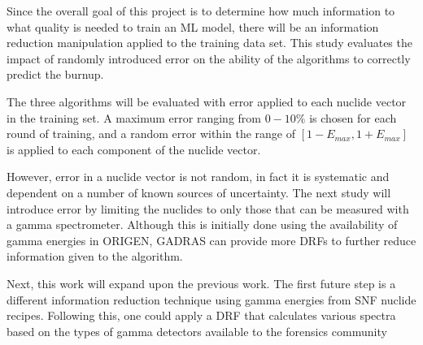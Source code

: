 Since the overall goal of this project is to determine how much information to
what quality is needed to train an \gls{ML} model, there will be an
information reduction manipulation applied to the training data set. This study
evaluates the impact of randomly introduced error on the ability of the
algorithms to correctly predict the burnup. 

The three algorithms will be evaluated with error applied to each nuclide
vector in the training set.  A maximum error ranging from $0 - 10\%$ is chosen
for each round of training, and a random error within the range of $[1-E_{max},
1+E_{max}]$ is applied to each component of the nuclide vector.

However, error in a nuclide vector is not random, in fact it is systematic and
dependent on a number of known sources of uncertainty. The next study will
introduce error by limiting the nuclides to only those that can be measured
with a gamma spectrometer. Although this is initially done using the
availability of gamma energies in \gls{ORIGEN}, \gls{GADRAS} can provide more
\gls{DRF}s to further reduce information given to the algorithm.

Next, this work will expand upon the previous work.  The first future step is a
different information reduction technique using gamma energies from \gls{SNF}
nuclide recipes.  Following this, one could apply a \gls{DRF} that calculates
various spectra based on the types of gamma detectors available to the
forensics community 

